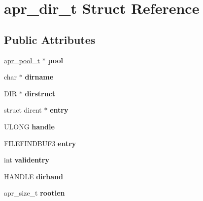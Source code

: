 \hypertarget{structapr__dir__t}{}\section{apr\+\_\+dir\+\_\+t Struct Reference}
\label{structapr__dir__t}
\subsection*{Public Attributes}
\begin{DoxyCompactItemize}
\item 
\mbox{\label{structapr__dir__t_a3cb1521d8e75d392e708934f9c6fd178}} 
\mbox{\hyperlink{group__apr__pools_gaf137f28edcf9a086cd6bc36c20d7cdfb}{apr\+\_\+pool\+\_\+t}} $\ast$ {\bfseries pool}
\item 
\mbox{\label{structapr__dir__t_a18ca7f45c18219d94b1e500c70301cbb}} 
char $\ast$ {\bfseries dirname}
\item 
\mbox{\label{structapr__dir__t_ab9a95626319c43bf881fef29494d4210}} 
D\+IR $\ast$ {\bfseries dirstruct}
\item 
\mbox{\label{structapr__dir__t_a3ca708a80f894cffc347ee35a5055d8c}} 
struct dirent $\ast$ {\bfseries entry}
\item 
\mbox{\label{structapr__dir__t_acfd3c206f3a37f9755d2fc02c6e025e7}} 
U\+L\+O\+NG {\bfseries handle}
\item 
\mbox{\label{structapr__dir__t_a468405126fb08d5880ec676d41c01b36}} 
F\+I\+L\+E\+F\+I\+N\+D\+B\+U\+F3 {\bfseries entry}
\item 
\mbox{\label{structapr__dir__t_a66d28636c6bf3b54be03ad229230f4a7}} 
int {\bfseries validentry}
\item 
\mbox{\label{structapr__dir__t_a89914216181b3734d90fe2d4cf513524}} 
H\+A\+N\+D\+LE {\bfseries dirhand}
\item 
\mbox{\label{structapr__dir__t_a97d647b007059676624eb23b3805fc6a}} 
apr\+\_\+size\+\_\+t {\bfseries rootlen}

\end{DoxyCompactItemize}
